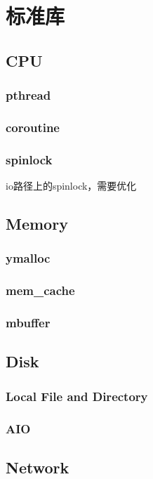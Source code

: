 \chapter{标准库}

\section{CPU}

\subsection{pthread}
\subsection{coroutine}
\subsection{spinlock}

io路径上的spinlock，需要优化

\section{Memory}

\subsection{ymalloc}
\subsection{mem\_cache}
\subsection{mbuffer}

\section{Disk}

\subsection{Local File and Directory}
\subsection{AIO}

\section{Network}

